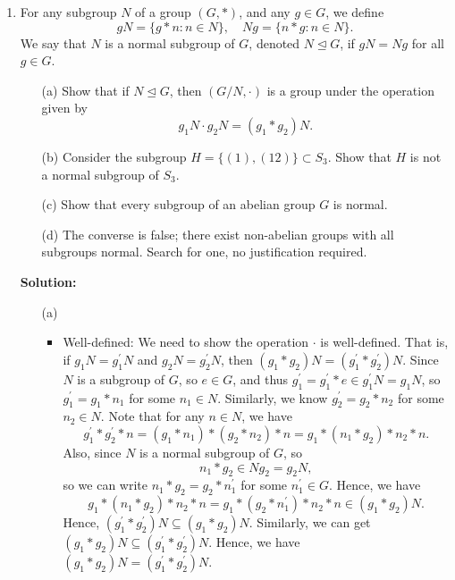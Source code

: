 \documentclass[12pt]{article}
\begin{document}
\begin{enumerate}
    \item For any subgroup $N$ of a group $(G, \ast)$, and any $g \in G$, we define
    \[
    gN = \{g \ast n : n \in N\}, \quad Ng = \{n \ast g : n \in N\}.
    \]
    We say that $N$ is a normal subgroup of $G$, denoted $N \trianglelefteq G$, if $gN = Ng$ for all $g \in G$.
    \begin{enumerate}
        \item[(a)] Show that if $N \trianglelefteq G$, then $(G/N, \cdot)$ is a group under the operation given by
        \[
        g_1N \cdot g_2N = (g_1 \ast g_2)N.
        \]
        \item[(b)] Consider the subgroup $H = \{(1), (12)\} \subset S_3$. Show that $H$ is not a normal
        subgroup of $S_3$.
        \item[(c)] Show that every subgroup of an abelian group $G$ is normal.
        \item[(d)] The converse is false; there exist non-abelian groups with all subgroups normal.
        Search for one, no justification required.
    \end{enumerate}
    \textbf{Solution:} 
    \begin{itemize}
        \item [(a)]
        \begin{itemize}
            \item Well-defined: We need to show the operation \(\cdot\) is well-defined. That is, if \(g_1 N = g_1 ^{\prime} N\) and \(g_2 N = g_2^{\prime} N\), then \((g_1 * g_2)N = (g_1^{\prime} * g_2^{\prime})N\). Since \(N\) is a subgroup of \(G\), so \(e \in G\), and thus \(g_1^{\prime} = g_1^{\prime}  * e \in g_1^{\prime}  N = g_1 N\), so \(g_1^{\prime} = g_1 * n_1\) for some \(n_1 \in N\). Similarly, we know \(g_2^{\prime} = g_2 * n_2\)  for some \(n_2 \in N\). Note that for any \(n \in N\), we have  
            \[
                g_1^{\prime} * g_2^{\prime} * n = (g_1 * n_1) * (g_2 * n_2) * n = g_1 * (n_1 * g_2) * n_2 * n.
            \] Also, since \(N\) is a normal subgroup of \(G\), so
            \[
                n_1 * g_2 \in N g_2 = g_2 N,
            \]so we can write \(n_1 * g_2 = g_2 * n_1^{\prime} \) for some \(n_1^{\prime} \in G\). Hence, we have 
            \[
                g_1 * (n_1 * g_2) * n_2 * n = g_1 * (g_2 * n_1^{\prime} ) * n_2 * n \in (g_1 * g_2)N.
            \]  Hence, \((g_1^{\prime} * g_2^{\prime} ) N \subseteq (g_1 * g_2)N\). Similarly, we can get \((g_1 * g_2)N \subseteq (g_1^{\prime} * g_2^{\prime} )N\). Hence, we have 
            \((g_1 * g_2)N = (g_1^{\prime} * g_2^{\prime} )N\).  

\end{itemize}
\end{itemize}
\end{enumerate}
\end{document}

